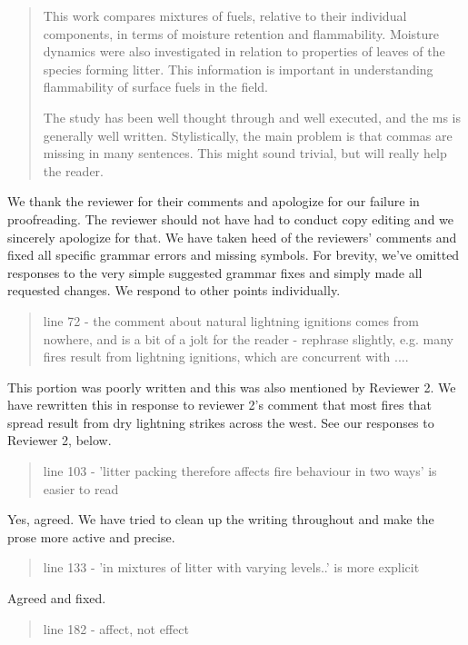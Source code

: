 \documentclass[letterpaper, 12pt]{letter}
\begin{document}
\begin{letter}{}
\begin{quote}
  This work compares mixtures of fuels, relative to their individual
  components, in terms of moisture retention and flammability. Moisture
  dynamics were also investigated in relation to properties of leaves of the
  species forming litter. This information is important in understanding
  flammability of surface fuels in the field.

  The study has been well thought through and well executed, and the ms is
  generally well written. Stylistically, the main problem is that commas are
  missing in many sentences. This might sound trivial, but will really help the
  reader.
\end{quote}

We thank the reviewer for their comments and apologize for our failure in
proofreading. The reviewer should not have had to conduct copy editing and we
sincerely apologize for that. We have taken heed of the reviewers' comments and
fixed all specific grammar errors and missing symbols. For brevity, we've
omitted responses to the very simple suggested grammar fixes and simply made
all requested changes. We respond to other points individually.

\begin{quote}
  line 72 - the comment about natural lightning ignitions comes from nowhere,
  and is a bit of a jolt for the reader - rephrase slightly, e.g. many fires
  result from lightning ignitions, which are concurrent with ....
\end{quote}

This portion was poorly written and this was also mentioned by Reviewer 2. We
have rewritten this in response to reviewer 2's comment that most fires that
spread result from dry lightning strikes across the west. See our responses to
Reviewer 2, below.

\begin{quote}
  line 103 - 'litter packing therefore affects fire behaviour in two ways' is
  easier to read
\end{quote}

Yes, agreed. We have tried to clean up the writing throughout and make the
prose more active and precise.

\begin{quote}
  line 133 - 'in mixtures of litter with varying levels..' is more explicit
\end{quote}

Agreed and fixed.

\begin{quote}
line 182 - affect, not effect
\end{quote}


\end{letter}
\end{document}
